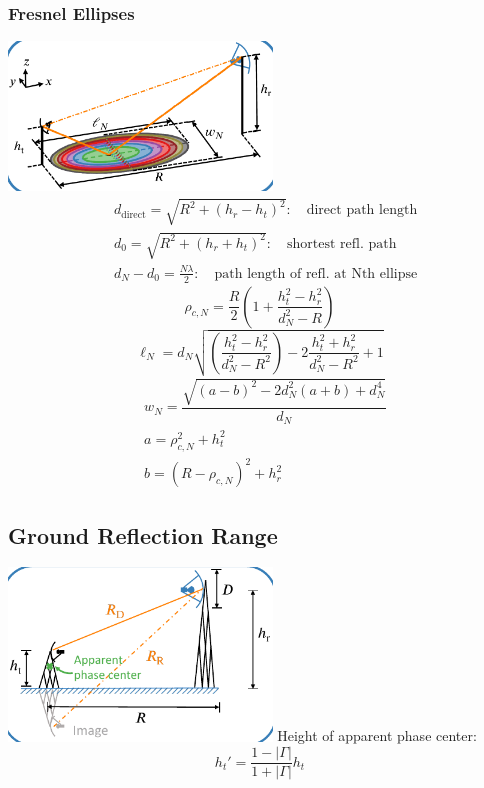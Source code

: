 \subsubsection{Fresnel Ellipses}
\includegraphics[width=7cm]{content/at_meas/pictures/nth_fresnel_ellipse}
\begin{align*}
  &d_{\text{direct}} = \sqrt{R^{2} + {(h_{r} - h_{t})}^{2}} : \quad \text{direct path length}\\
  &d_{0} = \sqrt{R^{2} + {(h_{r} + h_{t})}^{2}} : \quad \text{shortest refl.\ path}\\
  &d_{N}-d_{0} = \frac{N\lambda}{2} : \quad \text{path length of refl.\ at Nth ellipse}
\end{align*}
\begin{equation*}
  \rho_{c,N} = \dfrac{R}{2} \left(1 + \dfrac{h_{t}^{2} - h_{r}^{2}}{d_{N}^{2} - R}\right)
\end{equation*}
\begin{equation*}
  \ell_{N} = d_{N}\sqrt{\left(\dfrac{h_{t}^{2} - h_{r}^{2}}{d_{N}^{2} - R^{2}}\right) - 2 \dfrac{h_{t}^{2} + h_{r}^{2}}{d_{N}^{2} - R^{2}} + 1}
\end{equation*}
\begin{align*}
  &w_{N} = \dfrac{\sqrt{{(a - b)}^{2} - 2 d_{N}^{2}(a + b) + d_{N}^{4}}}{d_{N}}\\
  &a = \rho_{c,N}^{2} + h_{t}^{2}\\
  &b = {(R - \rho_{c,N})}^{2} + h_{r}^{2}
\end{align*}

\subsection{Ground Reflection Range}

\includegraphics[width=7cm]{content/at_meas/pictures/ground_reflection_range}
Height of apparent phase center:
\begin{equation*}
  h_{t}' = \dfrac{1 - |\Gamma|}{1 + |\Gamma|} h_{t}
\end{equation*}
